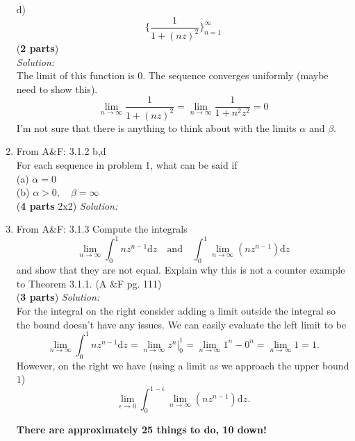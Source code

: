 \documentclass[10pt]{amsart}
\newcommand{\D}{\mathrm{d}}
\theoremstyle{nonumberplain}
\begin{document}
\begin{enumerate}[label={\bf {\arabic*}:}]
\noindent
d) $$ \bigg\{ \frac 1 {1 + (nz)^2} \bigg\}_{n=1}^{\infty} $$
(\textbf{2 parts}) \\
\textit{Solution:}\\
The limit of this function is 0. The sequence converges uniformly (maybe need to show this).
$$
\lim_{n\rightarrow\infty} \frac 1 {1 + (nz)^2} = \lim_{n\rightarrow\infty} \frac 1 {1 + n^2z^2} = 0
$$
I'm not sure that there is anything to think about with the limits $\alpha$ and $\beta$.
\\

\item From A\&F: 3.1.2 b,d \\
For each sequence in problem 1, what can be said if \\
(a) $\alpha = 0$ \\
(b) $\alpha > 0, \quad \beta = \infty$ \\
(\textbf{4 parts} 2x2)
\textit{Solution:} \\

\item From A\&F: 3.1.3
Compute the integrals
$$
\lim_{n \rightarrow \infty} \int_0^1 nz^{n -1}\D z \quad \text{and} \quad \int_0^1 \lim_{n \rightarrow \infty} \left(nz^{n -1} \right) \D z
$$
and show that they are not equal.
Explain why this is not a counter example to Theorem 3.1.1. (A \&F pg. 111) \\
(\textbf{3 parts})
\textit{Solution:} \\
For the integral on the right consider adding a limit outside the integral so the bound doesn't have any issues.
We can easily evaluate the left limit to be
$$
\lim_{n \rightarrow \infty} \int_0^1 nz^{n -1}\D z = \lim_{n \rightarrow \infty} \left. z^n \right|_0^1 = \lim_{n \rightarrow \infty} 1^n - 0^n = \lim_{n \rightarrow \infty} 1 = 1.
$$
However, on the right we have (using a limit as we approach the upper bound $1$)
$$
\lim_{\epsilon \rightarrow 0}\int_0^{1-\epsilon} \lim_{n \rightarrow \infty} \left(nz^{n -1} \right) \D z.
$$
    
\textbf{There are approximately 25 things to do, 10 down!}
\end{enumerate}
\end{document}
